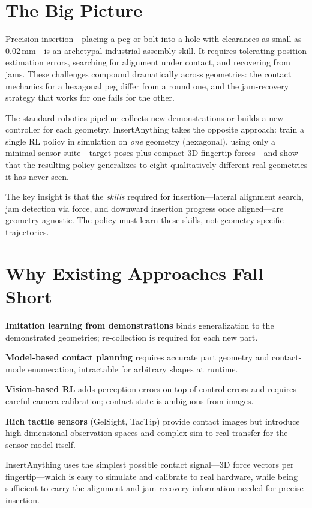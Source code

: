 \documentclass[10pt,twocolumn]{article}
\begin{document}
\section{The Big Picture}

Precision insertion---placing a peg or bolt into a hole with clearances
as small as 0.02\,mm---is an archetypal industrial assembly skill. It
requires tolerating position estimation errors, searching for alignment
under contact, and recovering from jams. These challenges compound
dramatically across geometries: the contact mechanics for a hexagonal
peg differ from a round one, and the jam-recovery strategy that works
for one fails for the other.

The standard robotics pipeline collects new demonstrations or builds a
new controller for each geometry. InsertAnything takes the opposite
approach: train a single RL policy in simulation on \emph{one} geometry
(hexagonal), using only a minimal sensor suite---target poses plus compact
3D fingertip forces---and show that the resulting policy generalizes to
eight qualitatively different real geometries it has never seen.

The key insight is that the \emph{skills} required for insertion---lateral
alignment search, jam detection via force, and downward insertion progress
once aligned---are geometry-agnostic. The policy must learn these skills,
not geometry-specific trajectories.

\section{Why Existing Approaches Fall Short}

\textbf{Imitation learning from demonstrations} binds generalization to
the demonstrated geometries; re-collection is required for each new part.

\textbf{Model-based contact planning} requires accurate part geometry and
contact-mode enumeration, intractable for arbitrary shapes at runtime.

\textbf{Vision-based RL} adds perception errors on top of control errors
and requires careful camera calibration; contact state is ambiguous from
images.

\textbf{Rich tactile sensors} (GelSight, TacTip) provide contact images
but introduce high-dimensional observation spaces and complex sim-to-real
transfer for the sensor model itself.

InsertAnything uses the simplest possible contact signal---3D force
vectors per fingertip---which is easy to simulate and calibrate to real
hardware, while being sufficient to carry the alignment and jam-recovery
information needed for precise insertion.
\end{document}
